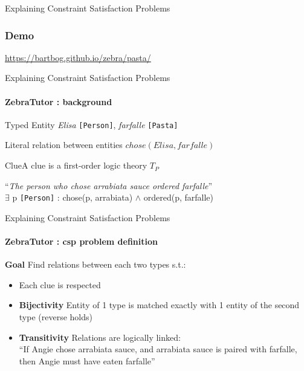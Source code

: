 \documentclass{beamer}
\newcommand\m[1]{\ensuremath{#1}\xspace}
\newcommand\allconstraints{\m{T_P}}
\begin{document}
\begin{frame}{\small{Explaining Constraint Satisfaction Problems}}
    \frametitle{Demo}

    \begin{center}
        {\Large \url{https://bartbog.github.io/zebra/pasta/}}
    \end{center}
    

\end{frame}

\begin{frame}{\small{Explaining Constraint Satisfaction Problems}}
    \framesubtitle{ZebraTutor : background}
    \begin{block}{Typed Entity} \textit{Elisa} \texttt{[Person]}, \textit{farfalle} \texttt{[Pasta]}\end{block}
    \vspace{0.5em}
    \begin{block}{Literal} relation between entities $chose(Elisa, farfalle)$\end{block}
    \vspace{0.5em}
    \begin{block}{Clue}A clue is a first-order logic theory $\allconstraints$
        \begin{center}
            ``\emph{The person who chose arrabiata sauce ordered farfalle}''\\
            \vspace{0.5em}
            $\exists$ p \texttt{[Person]} : chose(p, arrabiata) $\wedge$ ordered(p, farfalle)
        \end{center}
    \end{block}

\end{frame}

\begin{frame}{\small{Explaining Constraint Satisfaction Problems}}
    \framesubtitle{ZebraTutor : csp problem definition}
    \vfill
    \textbf{Goal} Find relations between each two types s.t.:
    {\small
    \begin{itemize}
        \item Each clue is respected
        \item \textbf{Bijectivity} Entity of 1 type is matched exactly with 1 entity of the second type (reverse holds)
        \item \textbf{Transitivity} Relations are logically linked:\\
              ``If Angie chose arrabiata sauce, and arrabiata sauce is paired with farfalle, then Angie must have eaten farfalle''
    \end{itemize}
    }

\end{frame}
\end{document}
